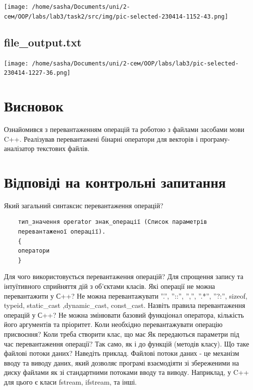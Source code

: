 \documentclass[a4paper, 12pt, oneside]{extarticle}
\begin{document}
\texttt{[image: /home/sasha/Documents/uni/2-сем/OOP/labs/lab3/task2/src/img/pic-selected-230414-1152-43.png]}

\subsection{file_output.txt}

\texttt{[image: /home/sasha/Documents/uni/2-сем/OOP/labs/lab3/pic-selected-230414-1227-36.png]}

\section*{Висновок}

Ознайомився з перевантаженням операцій та роботою з файлами засобами
мови C++. Реалізував перевантажені бінарні оператори для векторів і
програму-аналізатор текстових файлів.

\section*{Відповіді на контрольні запитання}
\begin{itemize}
	\question	Який загальний синтаксис перевантаження операцій?
	\answer
	\begin{verbatim}
	тип_значення operator знак_операції (Список параметрів
	перевантаженої операції).
	{
	оператори
	}
	\end{verbatim}

	\question	Для чого використовується перевантаження операцій?
	\answer Для спрощення запису та інтуїтивного сприйняття дій з об'єктами класів.
	\question	Які операції не можна перевантажити у С++?
	\answer Не можна перевантажувати ”.”, ”::”, ”,”, ”.*”, ”?:”, sizeof, typeid, static_cast ,dynamic_cast, const_cast.
	\question	Назвіть правила перевантаження операцій у С++?
	\answer Не можна змінювати базовий функціонал оператора, кількість його аргументів та пріоритет.
	\question	Коли необхідно перевантажувати операцію присвоєння?
	\answer Коли треба створити клас, що має
	\question	Як передаються параметри під час перевантаження операції?
	\answer Так само, як і до функцій (методів класу).
	\question	Що таке файлові потоки даних? Наведіть приклад.
	\answer Файлові потоки даних - це механізм вводу та виводу даних, який дозволяє програмі взаємодіяти зі збереженими на диску файлами як зі стандартними потоками вводу та виводу. Наприклад, у C++ для цього є класи fstream, ifstream, та інші.
\end{itemize}
\end{document}
